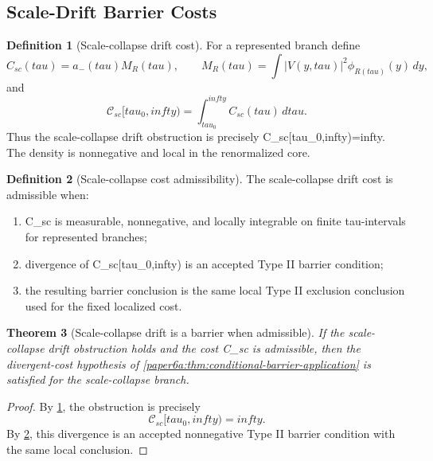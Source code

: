 \documentclass[11pt]{amsart}
\def\({}%
\def\){}%
\def\mathfrak#1{#1}%
\def\mathrm#1{#1}%
\def\tau{tau}%
\def\infty{infty}%
\theoremstyle{plain}
\newtheorem{theorem}{Theorem}[section]
\theoremstyle{definition}
\newtheorem{definition}[theorem]{Definition}
\theoremstyle{remark}
\begin{document}
\subsection{Scale-Drift Barrier Costs}

\begin{definition}[Scale-collapse drift cost]\label{paper6a:def:scale-collapse-cost}
For a represented branch define
\[
  \mathfrak C_{\mathrm{sc}}(\tau)
  =
  a_-(\tau)M_R(\tau),
  \qquad
  M_R(\tau)=\int |V(y,\tau)|^2\phi_{R(\tau)}(y)\,dy,
\]
and
\[
  \mathcal C_{\mathrm{sc}}[\tau_0,\infty)
  =
  \int_{\tau_0}^{\infty}\mathfrak C_{\mathrm{sc}}(\tau)\,d\tau .
\]
Thus the scale-collapse drift obstruction is precisely
\(\mathcal C_{\mathrm{sc}}[\tau_0,\infty)=\infty\).  The density is
nonnegative and local in the renormalized core.
\end{definition}

\begin{definition}[Scale-collapse cost admissibility]\label{paper6a:def:scale-collapse-cost-admissibility}
The scale-collapse drift cost is admissible when:
\begin{enumerate}[label=\textup{(\roman*)}]
\item \(\mathfrak C_{\mathrm{sc}}\) is measurable, nonnegative, and locally
integrable on finite \(\tau\)-intervals for represented branches;
\item divergence of \(\mathcal C_{\mathrm{sc}}[\tau_0,\infty)\) is an
accepted Type II barrier condition;
\item the resulting barrier conclusion is the same local Type II exclusion
conclusion used for the fixed localized cost.
\end{enumerate}
\end{definition}

\begin{theorem}[Scale-collapse drift is a barrier when admissible]
\label{paper6a:thm:scale-collapse-drift-barrier}
If the scale-collapse drift obstruction holds and the cost
\(\mathfrak C_{\mathrm{sc}}\) is admissible, then the divergent-cost hypothesis
of \cref{paper6a:thm:conditional-barrier-application} is satisfied for the
scale-collapse branch.
\end{theorem}

\begin{proof}
By \cref{paper6a:def:scale-collapse-cost}, the obstruction is precisely
\[
  \mathcal C_{\mathrm{sc}}[\tau_0,\infty)=\infty .
\]
By \cref{paper6a:def:scale-collapse-cost-admissibility}, this divergence is an
accepted nonnegative Type II barrier condition with the same local conclusion.
\end{proof}
\end{document}

